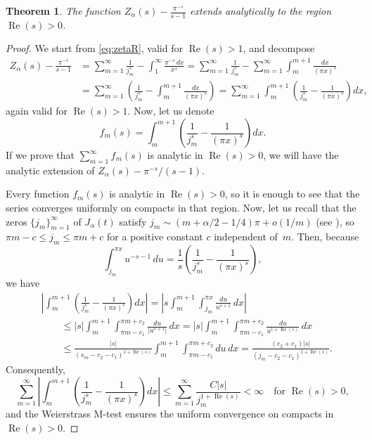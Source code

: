 \documentclass[a4paper]{amsart}
\renewcommand{\Re}{\operatorname{Re}}
\theoremstyle{plain}
\newtheorem{theorem}{Theorem}[section]
\theoremstyle{definition}
\theoremstyle{remark}
\numberwithin{equation}{section}
\begin{document}
\begin{theorem}
\label{teo:zetaRanal0}
The function $Z_{\alpha}(s) - \frac{\pi^{-s}}{s-1}$ extends analytically to the region $\Re(s)>0$.
\end{theorem}

\begin{proof}
We start from \eqref{eq:zetaR}, valid for $\Re(s)>1$, and decompose
\begin{align*}
  Z_{\alpha}(s) - \frac{\pi^{-s}}{s-1} 
  &= \sum_{m=1}^{\infty} \frac{1}{j_m^s} - \int_1^{\infty} \frac{\pi^{-s}\,dx}{x^s}
  = \sum_{m=1}^{\infty} \frac{1}{j_m^s} - \sum_{m=1}^{\infty} \int_m^{m+1} \frac{dx}{(\pi x)^s} \\
  &= \sum_{m=1}^{\infty} \left(\frac{1}{j_m^s} - \int_m^{m+1} \frac{dx}{(\pi x)^s} \right)
  = \sum_{m=1}^{\infty} \int_m^{m+1} \left( \frac{1}{j_m^s} - \frac{1}{(\pi x)^s} \right) dx,
\end{align*}
again valid for $\Re(s)>1$. Now, let us denote
\[
  f_m(s) = \int_m^{m+1} \left( \frac{1}{j_m^s} - \frac{1}{(\pi x)^s} \right) dx.
\]
If we prove that $\sum_{m=1}^{\infty} f_m(s)$ is analytic in $\Re(s)>0$, we will have the analytic extension of $Z_{\alpha}(s) - {\pi^{-s}}/(s-1)$.

Every function $f_m(s)$ is analytic in $\Re(s)>0$, so it is enough to see that the series converges uniformly on compacts in that region.
Now, let us recall that the zeros $\{j_m\}_{m=1}^\infty$ of $J_{\alpha}(t)$ satisfy 
$j_m \sim (m + \alpha/2 - 1/4)\pi + o(1/m)$ (see \cite[10.21.19] {OlMa-NIST}),
so $\pi m-c \le j_{m} \le \pi m+c$ for a positive constant $c$ independent of~$m$.
Then, because
\[
  \int_{j_m}^{\pi x} u^{-s-1}\,du 
  = \frac{1}{s} \left( \frac{1}{j_m^s} - \frac{1}{(\pi x)^s} \right),
\]
we have
\begin{align*}
  &\left| \int_m^{m+1} \left( \frac{1}{j_m^s} - \frac{1}{(\pi x)^s} \right) dx \right|
  = \left| s \int_m^{m+1} \! \int_{j_m}^{\pi x} \frac{du}{u^{s+1}} \,dx \right| \\
  &\qquad\le |s| \int_m^{m+1} \! \int_{\pi m-c_1}^{\pi m+c_2} \frac{du}{|u^{s+1}|} \,dx 
  = |s| \int_m^{m+1} \! \int_{\pi m-c_1}^{\pi m+c_2} \frac{du}{u^{1+\Re(s)}} \,dx \\
  &\qquad\le \frac{|s|}{(s_m-c_2-c_1)^{1+\Re(s)}} \int_m^{m+1} \int_{\pi m-c_1}^{\pi m+c_2} du \,dx
  = \frac{(c_2+c_1) |s|}{(j_m-c_2-c_1)^{1+\Re(s)}}.
\end{align*}
Consequently,
\[
  \sum_{m=1}^{\infty} \left| \int_m^{m+1} \left( \frac{1}{j_m^s} - \frac{1}{(\pi x)^s} \right) dx \right|
  \le \sum_{m=1}^{\infty} \frac{C |s|}{j_m^{1+\Re(s)}}
  < \infty \quad\text{for }\Re(s) > 0,
\]
and the Weierstrass M-test ensures the uniform convergence on compacts in $\Re(s)>0$.
\end{proof}
\end{document}

